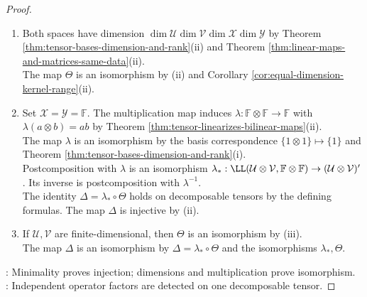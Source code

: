 \begin{theorem}
\begin{proof}
\begin{enumerate}[label=(\roman*)]
Choose $\mathbf{u}\in\mathcal{U}$ with $A_1\mathbf{u}\neq0$. After reindexing, let $A_1\mathbf{u},\ldots,A_m\mathbf{u}$ be a basis of $\operatorname{span}\{A_i\mathbf{u}:1\leq i\leq r\}$.\\
For $m<j\leq r$, write $A_j\mathbf{u}=\sum\limits_{i=1}^{m}c_{ij}A_i\mathbf{u}$. Set $C_i\defeq B_i+\sum\limits_{j=m+1}^{r}c_{ij}B_j$ for $1\leq i\leq m$. Then $C_i\neq0$ by independence of $(B_i)_{i=1}^{r}$.\\
For $\mathbf{v}\in\mathcal{V}$, $\Theta(Z)(\mathbf{u}\otimes\mathbf{v})=\sum\limits_{i=1}^{m}(A_i\mathbf{u})\otimes C_i\mathbf{v}$. If $\Theta(Z)=0$, then $(\forall\,i\in\{1,\ldots,m\})(\forall\,\mathbf{v}\in\mathcal{V})\,C_i\mathbf{v}=\mathbf{0}$ by Theorem \ref{thm:tensor-zero-test-and-decomposable-rank}(ii).\\
The conclusion $(\forall\,i\in\{1,\ldots,m\})\,C_i=0$ holds by Assumption \ref{assump:function-extensionality}, contrary to the preceding nonvanishing.\\
The inequality $\Theta(Z)\neq0$ holds by contradiction, and $\Theta$ is injective.
\item Both spaces have dimension $\dim\mathcal{U}\dim\mathcal{V}\dim\mathcal{X}\dim\mathcal{Y}$ by Theorem \ref{thm:tensor-bases-dimension-and-rank}(ii) and Theorem \ref{thm:linear-maps-and-matrices-same-data}(ii).\\
The map $\Theta$ is an isomorphism by (ii) and Corollary \ref{cor:equal-dimension-kernel-range}(ii).
\item Set $\mathcal{X}=\mathcal{Y}=\mathbb{F}$. The multiplication map induces $\lambda:\mathbb{F}\otimes\mathbb{F}\to\mathbb{F}$ with $\lambda(a\otimes b)=ab$ by Theorem \ref{thm:tensor-linearizes-bilinear-maps}(ii).\\
The map $\lambda$ is an isomorphism by the basis correspondence $\{1\otimes1\}\mapsto\{1\}$ and Theorem \ref{thm:tensor-bases-dimension-and-rank}(i).\\
Postcomposition with $\lambda$ is an isomorphism $\lambda_\ast:\LL(\mathcal{U}\otimes\mathcal{V},\mathbb{F}\otimes\mathbb{F})\to(\mathcal{U}\otimes\mathcal{V})'$. Its inverse is postcomposition with $\lambda^{-1}$.\\
The identity $\Delta=\lambda_\ast\circ\Theta$ holds on decomposable tensors by the defining formulas. The map $\Delta$ is injective by (ii).
\item If $\mathcal{U},\mathcal{V}$ are finite-dimensional, then $\Theta$ is an isomorphism by (iii).\\
The map $\Delta$ is an isomorphism by $\Delta=\lambda_\ast\circ\Theta$ and the isomorphisms $\lambda_\ast,\Theta$.
\end{enumerate}
: Minimality proves injection; dimensions and multiplication prove isomorphism.\\
: Independent operator factors are detected on one decomposable tensor.
\end{proof}
\end{theorem}

